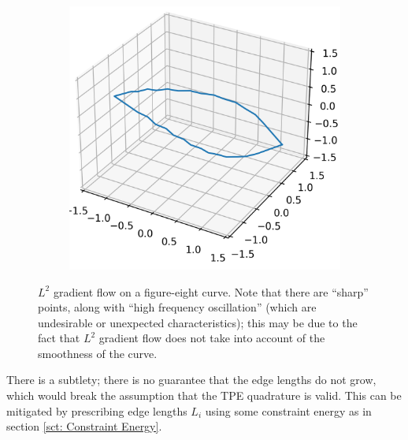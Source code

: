 \documentclass[../dissertation.tex]{subfiles}
\begin{document}
\begin{figure}[tbp]
\begin{subfigure}[b]{0.32\textwidth}
    \end{subfigure}
    \begin{subfigure}[b]{0.32\textwidth}
        \centering
        \includegraphics[width=\textwidth]{sections/unknottingCurveImgs/figure8-L2-2}
    \end{subfigure}

    \caption{$L^2$ gradient flow on a figure-eight curve. Note that there are ``sharp'' points, along with ``high frequency oscillation'' (which are undesirable or unexpected characteristics); this may be due to the fact that $L^2$ gradient flow does not take into account of the smoothness of the curve.}
    \label{fig: L2 Curve Unknotting}
\end{figure}
There is a subtlety;
there is no guarantee that the edge lengths do not grow,
which would break the assumption that the TPE quadrature is valid.
This can be mitigated by prescribing edge lengths $L_i$ using some constraint energy as in section \ref{sct: Constraint Energy}.
\end{document}

